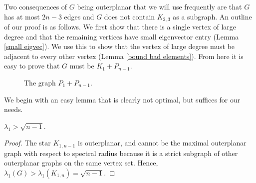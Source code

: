 Two consequences of $G$ being outerplanar that we will use frequently are that $G$ has at most $2n-3$ edges and $G$ does not contain $K_{2,3}$ as a subgraph. An outline of our proof is as follows. We first show that there is a single vertex of large degree and that the remaining vertices have small eigenvector entry (Lemma \ref{small eigvec}). We use this to show that the vertex of large degree must be adjacent to every other vertex (Lemma \ref{bound bad elements}). From here it is easy to prove that $G$ must be $K_1+P_{n-1}$.

\begin{figure}[]
\begin{center}
\begingroup

\setlength{\unitlength}{.01cm}
{
\setlength{\fboxsep}{10pt}
}
\endgroup
\end{center}
\caption{The graph $P_1 + P_{n-1}$.
   \label{fig-pn4}}
\end{figure}


We begin with an easy lemma that is clearly not optimal, but suffices for our needs.
\begin{lemma}\label{trivial lambda bound}
 $\lambda_1 > \sqrt{n-1}$.
\end{lemma}
\begin{proof}
 The star $K_{1,n-1}$ is outerplanar, and cannot be the maximal outerplanar
 graph with respect to spectral radius because it is a strict subgraph of other outerplanar graphs on the same vertex set.  Hence, $\lambda_1(G) > \lambda_1(K_{1,n}) = \sqrt{n-1}$.
\end{proof}

